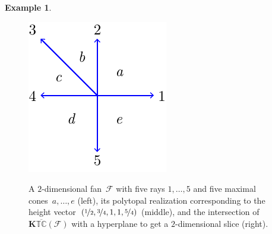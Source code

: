 \documentclass{amsart}
\theoremstyle{definition}
\newtheorem{example}[theorem]{Example}
\renewcommand{\b}[1]{{\boldsymbol{#1}}} %
\newcommand{\Fan}{\mathcal{F}} %
\newcommand{\ctypeCone}{\overline{\mathbb{TC}}} %
\begin{document}
\begin{example}
\begin{figure}[htpb]
	\capstart
	\centerline{{\includegraphics[scale=1]{typeConeFan}}  \quad {}}
	\caption{A $2$-dimensional fan~$\Fan$ with five rays $1, \dots, 5$ and five maximal cones~$a, \dots, e$ (left), its polytopal realization corresponding to the height vector~$(\nicefrac{1}{2}, \nicefrac{3}{4}, 1, 1, \nicefrac{5}{4})$ (middle), and the intersection of $\b{K}\ctypeCone(\Fan)$ with a hyperplane to get a $2$-dimensional slice (right).}
	\label{fig:typeCone}
\end{figure}
\end{example}
\end{document}
